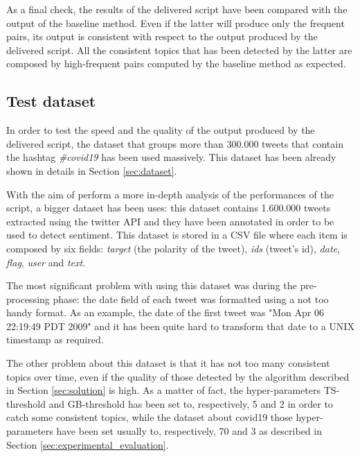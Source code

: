 As a final check, the results of the delivered script have been compared with the output of the baseline method. Even if the latter will produce only the frequent pairs, its output is consistent with respect to the output produced by the delivered script. All the consistent topics that has been detected by the latter are composed by high-frequent pairs computed by the baseline method as expected.

\subsection{Test dataset}
\label{subsec:test_dataset}
In order to test the speed and the quality of the output produced by the delivered script, the dataset that groups more than 300.000 tweets that contain the hashtag \textit{\#covid19} \cite{covid19-tweets-dataset} has been used massively. This dataset has been already shown in details in Section \ref{sec:dataset}.

With the aim of perform a more in-depth analysis of the performances of the script, a bigger dataset has been uses: this dataset \cite{sentiment-analysis-dataset} contains 1.600.000 tweets extracted using the twitter API and they have been annotated in order to be used to detect sentiment. This dataset is stored in a CSV file where each item is composed by six fields: \textit{target} (the polarity of the tweet), \textit{ids} (tweet's id), \textit{date}, \textit{flag}, \textit{user} and \textit{text}. 

The most significant problem with using this dataset was during the pre-processing phase: the date field of each tweet was formatted using a not too handy format. As an example, the date of the first tweet was "Mon Apr 06 22:19:49 PDT 2009" and it has been quite hard to transform that date to a UNIX timestamp as required.

The other problem about this dataset is that it has not too many consistent topics over time, even if the quality of those detected by the algorithm described in Section \ref{sec:solution} is high. As a matter of fact, the hyper-parameters TS-threshold and GB-threshold has been set to, respectively, 5 and 2 in order to catch some consistent topics, while the dataset about covid19 \cite{covid19-tweets-dataset} those hyper-parameters have been set usually to, respectively, 70 and 3 as described in Section \ref{sec:experimental_evaluation}. 